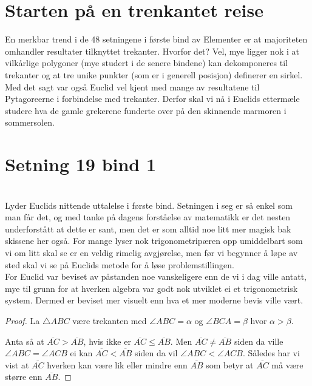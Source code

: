 \documentclass[12pt,
               a4paper,
               article,
               oneside,
               oldfontcommands,
               norsk]{memoir}
\begin{document}
\section*{\protect\centering Starten på en trenkantet reise}
En merkbar trend i de 48 setningene i første bind av Elementer er at majoriteten omhandler resultater tilknyttet trekanter. Hvorfor det? Vel, mye ligger nok i at vilkårlige polygoner (mye studert i de senere bindene) kan dekomponeres til trekanter og at tre unike punkter (som er i generell posisjon) definerer en sirkel. Med det sagt var også Euclid vel kjent med mange av resultatene til Pytagoreerne i forbindelse med trekanter. Derfor skal vi nå i Euclids ettermæle studere hva de gamle grekerene funderte over på den skinnende marmoren i sommersolen. 
\section{\large Setning 19 bind 1}
\vspace{4mm}
 \vspace{3mm} \\ 
Lyder Euclids nittende uttalelse i første bind. Setningen i seg er så enkel som man får det, og med tanke på dagens forståelse av matematikk er det nesten underforstått at dette er sant, men det er som alltid noe litt mer magisk bak skissene her også. For mange lyser nok trigonometripæren opp umiddelbart som vi om litt skal se er en veldig rimelig avgjørelse, men før vi begynner å løpe av sted skal vi se på Euclids metode for å løse problemstillingen. \vspace{4mm}\\
For Euclid var beviset av påstanden noe vanskeligere enn de vi i dag ville antatt, mye til grunn for at hverken algebra var godt nok utviklet ei et trigonometrisk system. Dermed er beviset mer visuelt enn hva et mer moderne bevis ville vært. 
\begin{proof}
  La $\triangle ABC$ være trekanten med $\angle ABC = \alpha$ og $\angle BCA = \beta$ hvor $ \alpha > \beta$.
  \begin{figure}[H]
    \centering 
    
    \caption{}
  \end{figure}
Anta så at $\overline{AC} > \overline{AB}$, hvis ikke er $\overline{AC} \leq \overline{AB}$. Men $\overline{AC} \neq \overline{AB}$ siden da ville $\angle ABC = \angle ACB$ ei kan $\overline{AC} < \overline{AB}$ siden da vil  $\angle ABC < \angle ACB$. Således har vi vist at $\overline{AC}$ hverken kan være lik eller mindre enn $\overline{AB}$ som betyr at $\overline{AC}$ må være større enn $\overline{AB}$.
\end{proof} \cite{Prop_19}
\end{document}
